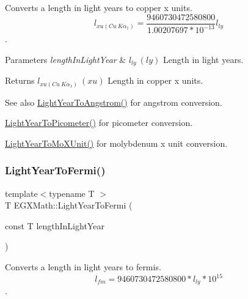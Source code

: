 Converts a length in light years to copper x units. \[ l_{xu(Cu\ K\alpha_1)}= \frac{9460730472580800}{1.00207697*10^{-13}} l_{ly}\]. 


\begin{DoxyParams}{Parameters}
{\em length\+In\+Light\+Year} & $ l_{ly}\ (ly)$ Length in light years. \\
\hline
\end{DoxyParams}
\begin{DoxyReturn}{Returns}
$ l_{xu(Cu\ K\alpha_1)}\ (xu)$ Length in copper x units. 
\end{DoxyReturn}
\begin{DoxySeeAlso}{See also}
\mbox{\hyperlink{group___e_g_x_math-_conversions-_length_conversions-_astronomical-_light_year-_non-_s_i_ga09634a7c514e3a0f573e7c171a791f78}{Light\+Year\+To\+Angstrom()}} for angstrom conversion. 

\mbox{\hyperlink{group___e_g_x_math-_conversions-_length_conversions-_astronomical-_light_year-_s_i_ga6dc5dc3c9584f578c4a935552fb965b7}{Light\+Year\+To\+Picometer()}} for picometer conversion. 

\mbox{\hyperlink{group___e_g_x_math-_conversions-_length_conversions-_astronomical-_light_year-_non-_s_i_gac275191181b93d118ec2b21cf09ff356}{Light\+Year\+To\+Mo\+X\+Unit()}} for molybdenum x unit conversion. 
\end{DoxySeeAlso}
\mbox{\label{group___e_g_x_math-_conversions-_length_conversions-_astronomical-_light_year-_non-_s_i_gaf3a2acd1e1653e2cecd6c299abe78524}} 
\subsubsection{\texorpdfstring{Light\+Year\+To\+Fermi()}{LightYearToFermi()}}
{\footnotesize\ttfamily template$<$typename T $>$ \\
T E\+G\+X\+Math\+::\+Light\+Year\+To\+Fermi (\begin{DoxyParamCaption}\item[{const T}]{length\+In\+Light\+Year }\end{DoxyParamCaption})}



Converts a length in light years to fermis. \[ l_{fm}=9460730472580800 * l_{ly} * 10^{15} \]. 


